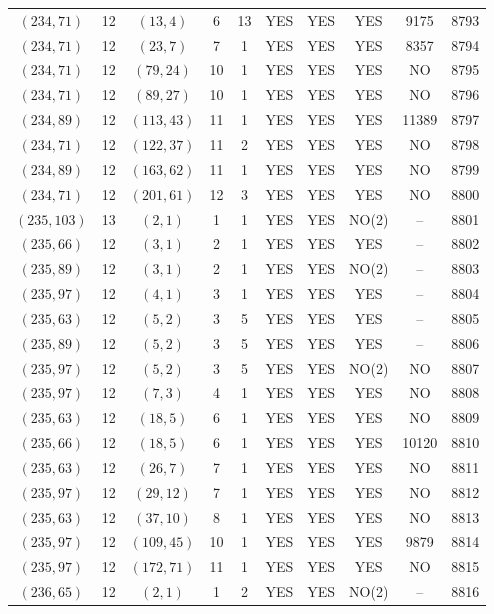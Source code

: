 \begin{longtable}{|c|c|c|c|c|c|c|c|c|c|}
$(234, 71)$ & 12 & $(13, 4)$ & 6 & 13 & YES & YES & YES & 9175 & 8793\\
$(234, 71)$ & 12 & $(23, 7)$ & 7 & 1 & YES & YES & YES & 8357 & 8794\\
$(234, 71)$ & 12 & $(79, 24)$ & 10 & 1 & YES & YES & YES & NO & 8795\\
$(234, 71)$ & 12 & $(89, 27)$ & 10 & 1 & YES & YES & YES & NO & 8796\\
$(234, 89)$ & 12 & $(113, 43)$ & 11 & 1 & YES & YES & YES & 11389 & 8797\\
$(234, 71)$ & 12 & $(122, 37)$ & 11 & 2 & YES & YES & YES & NO & 8798\\
$(234, 89)$ & 12 & $(163, 62)$ & 11 & 1 & YES & YES & YES & NO & 8799\\
$(234, 71)$ & 12 & $(201, 61)$ & 12 & 3 & YES & YES & YES & NO & 8800\\
$(235, 103)$ & 13 & $(2, 1)$ & 1 & 1 & YES & YES & NO(2) & -- & 8801\\
$(235, 66)$ & 12 & $(3, 1)$ & 2 & 1 & YES & YES & YES & -- & 8802\\
$(235, 89)$ & 12 & $(3, 1)$ & 2 & 1 & YES & YES & NO(2) & -- & 8803\\
$(235, 97)$ & 12 & $(4, 1)$ & 3 & 1 & YES & YES & YES & -- & 8804\\
$(235, 63)$ & 12 & $(5, 2)$ & 3 & 5 & YES & YES & YES & -- & 8805\\
$(235, 89)$ & 12 & $(5, 2)$ & 3 & 5 & YES & YES & YES & -- & 8806\\
$(235, 97)$ & 12 & $(5, 2)$ & 3 & 5 & YES & YES & NO(2) & NO & 8807\\
$(235, 97)$ & 12 & $(7, 3)$ & 4 & 1 & YES & YES & YES & NO & 8808\\
$(235, 63)$ & 12 & $(18, 5)$ & 6 & 1 & YES & YES & YES & NO & 8809\\
$(235, 66)$ & 12 & $(18, 5)$ & 6 & 1 & YES & YES & YES & 10120 & 8810\\
$(235, 63)$ & 12 & $(26, 7)$ & 7 & 1 & YES & YES & YES & NO & 8811\\
$(235, 97)$ & 12 & $(29, 12)$ & 7 & 1 & YES & YES & YES & NO & 8812\\
$(235, 63)$ & 12 & $(37, 10)$ & 8 & 1 & YES & YES & YES & NO & 8813\\
$(235, 97)$ & 12 & $(109, 45)$ & 10 & 1 & YES & YES & YES & 9879 & 8814\\
$(235, 97)$ & 12 & $(172, 71)$ & 11 & 1 & YES & YES & YES & NO & 8815\\
$(236, 65)$ & 12 & $(2, 1)$ & 1 & 2 & YES & YES & NO(2) & -- & 8816\\

\end{longtable}
